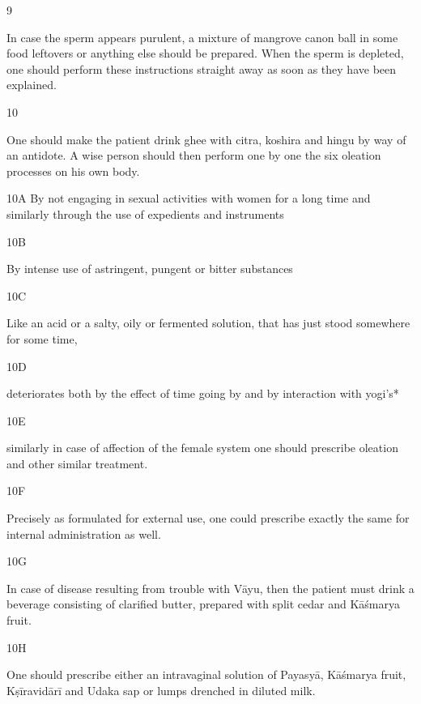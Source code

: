 \begin{translation}
\begin{tt}
 \item[9]
 
  In case the sperm appears purulent, a mixture of mangrove canon ball in some 
  food leftovers or anything else should be prepared. When the sperm is 
  depleted, one should perform these instructions straight away as soon as they 
  have been explained.
 
 \item[10]
 
  One should make the patient drink ghee with citra, koshira and hingu by way of 
  an antidote. A wise person should then perform one by one the six oleation 
  processes on his own body.
  
  
  
\item[10A]  By not engaging in sexual activities with women for a long time and 
similarly 
  through the use of expedients and instruments
  
\item[10B]

By intense use of astringent, pungent or bitter substances
  
\item[10C]

Like an acid or a salty, oily or fermented solution, that has just stood 
  somewhere for some time,
  
\item[10D]

deteriorates both by the effect of time going by and by interaction with 
  yogi’s*  
  
\item[10E]

similarly in case of affection of the female system one should prescribe 
  oleation and other  similar treatment.
  
\item[10F]

Precisely as formulated for external use, one could prescribe exactly 
  the same for internal administration as well.
  
\item[10G]

In case of disease resulting from trouble with Vāyu, then the patient 
  must drink a beverage consisting of clarified butter, prepared with split cedar 
  and Kāśmarya fruit.
  
\item[10H]

One should prescribe either an intravaginal solution of Payasyā, 
  Kāśmarya fruit, Kṣīravidārī and Udaka sap or lumps drenched in diluted milk.
  

\end{tt}
\end{translation}
